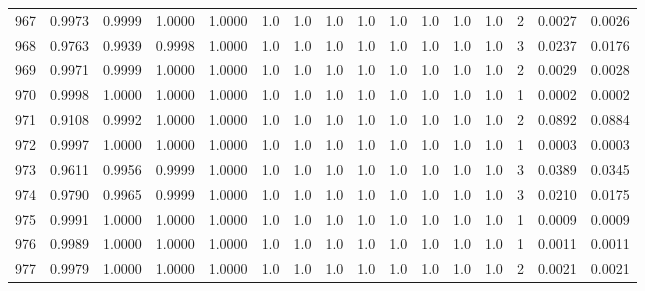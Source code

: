 \begin{tabular}{lrrrrrrrrrrrrrrr}
967 &      0.9973 &  0.9999 &  1.0000 &  1.0000 &     1.0 &     1.0 &     1.0 &     1.0 &     1.0 &     1.0 &      1.0 &        1.0 &      2 &                    0.0027 &                     0.0026 \\
968 &      0.9763 &  0.9939 &  0.9998 &  1.0000 &     1.0 &     1.0 &     1.0 &     1.0 &     1.0 &     1.0 &      1.0 &        1.0 &      3 &                    0.0237 &                     0.0176 \\
969 &      0.9971 &  0.9999 &  1.0000 &  1.0000 &     1.0 &     1.0 &     1.0 &     1.0 &     1.0 &     1.0 &      1.0 &        1.0 &      2 &                    0.0029 &                     0.0028 \\
970 &      0.9998 &  1.0000 &  1.0000 &  1.0000 &     1.0 &     1.0 &     1.0 &     1.0 &     1.0 &     1.0 &      1.0 &        1.0 &      1 &                    0.0002 &                     0.0002 \\
971 &      0.9108 &  0.9992 &  1.0000 &  1.0000 &     1.0 &     1.0 &     1.0 &     1.0 &     1.0 &     1.0 &      1.0 &        1.0 &      2 &                    0.0892 &                     0.0884 \\
972 &      0.9997 &  1.0000 &  1.0000 &  1.0000 &     1.0 &     1.0 &     1.0 &     1.0 &     1.0 &     1.0 &      1.0 &        1.0 &      1 &                    0.0003 &                     0.0003 \\
973 &      0.9611 &  0.9956 &  0.9999 &  1.0000 &     1.0 &     1.0 &     1.0 &     1.0 &     1.0 &     1.0 &      1.0 &        1.0 &      3 &                    0.0389 &                     0.0345 \\
974 &      0.9790 &  0.9965 &  0.9999 &  1.0000 &     1.0 &     1.0 &     1.0 &     1.0 &     1.0 &     1.0 &      1.0 &        1.0 &      3 &                    0.0210 &                     0.0175 \\
975 &      0.9991 &  1.0000 &  1.0000 &  1.0000 &     1.0 &     1.0 &     1.0 &     1.0 &     1.0 &     1.0 &      1.0 &        1.0 &      1 &                    0.0009 &                     0.0009 \\
976 &      0.9989 &  1.0000 &  1.0000 &  1.0000 &     1.0 &     1.0 &     1.0 &     1.0 &     1.0 &     1.0 &      1.0 &        1.0 &      1 &                    0.0011 &                     0.0011 \\
977 &      0.9979 &  1.0000 &  1.0000 &  1.0000 &     1.0 &     1.0 &     1.0 &     1.0 &     1.0 &     1.0 &      1.0 &        1.0 &      2 &                    0.0021 &                     0.0021 \\

\end{tabular}
